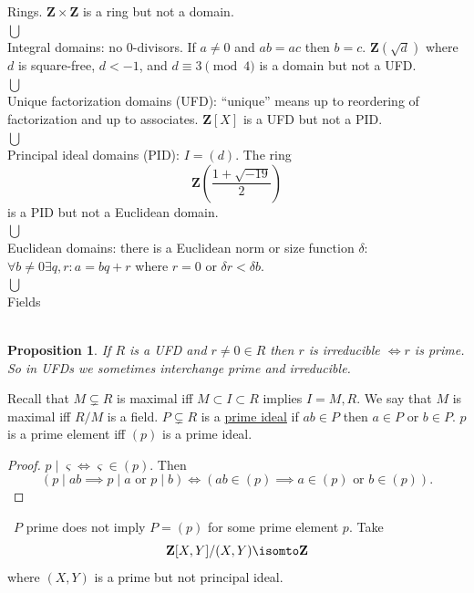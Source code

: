\documentclass[11pt, oneside]{amsart}
\numberwithin{equation}{section}
\numberwithin{theorem}{section}
\newtheorem{proposition}[theorem]{Proposition}
\theoremstyle{definition}
\def\Z{\mathbf{Z}}
\begin{document}
{{\centering 
Rings. $\Z\times \Z$ is a ring but not a domain. \\ %
$\bigcup$\\
Integral domains: no $0$-divisors. If $a\neq 0$ and $ab=ac$ then $b=c$. $\Z(\sqrt d)$ where $d$ is square-free, $d<-1$, and $d\equiv 3\pmod 4$ is a domain but not a UFD. \\
$\bigcup$\\
Unique factorization domains (UFD): ``unique'' means up to reordering of factorization and up to associates. $\Z[X]$ is a UFD but not a PID. \\  %
$\bigcup$\\
Principal ideal domains (PID): $I=(d)$. The ring 
$$
\Z\left(   \frac{1+\sqrt {-19}}{2}   \right)
$$
is a PID but not a Euclidean domain.\\ %
$\bigcup$\\
Euclidean domains: there is a Euclidean norm or size function $\delta$: $\forall b\neq 0\exists q,r: a = bq+r$ where $r=0$ or $\delta r < \delta b$.\\
$\bigcup$\\
Fields\\\textrm{}\\
}

\begin{proposition}
If $R$ is a UFD and $r\neq 0\in R$ then $r$ is irreducible $\iff r$ is prime. So in UFDs we sometimes interchange prime and irreducible.
\end{proposition}

Recall that $M\subsetneq R$ is maximal iff $M\subset I\subset R$ implies $I =M, R$. We say that $M$ is maximal iff $R/M$ is a field. $P\subsetneq R$  is a \underline{prime ideal} if $ab\in P$ then $a\in P$ or $b\in P$. $p$ is a prime element iff $(p)$ is a prime ideal. \begin{proof}
$p\mid \varsigma \iff \varsigma\in (p)$. Then
$$
(p\mid ab \implies p\mid a \textrm{ or } p\mid b) \iff (ab\in (p) \implies a\in(p)\textrm{ or } b\in (p)).
$$
\end{proof} 
\noindent\hspace*{-23pt} \dbend\ $P$ prime does not imply $P=(p)$ for some prime element $p$. Take 
$$
\Z[X,Y]/(X,Y)\isomto \Z
$$
where $(X,Y)$ is a prime but not principal ideal.

}
\end{document}
